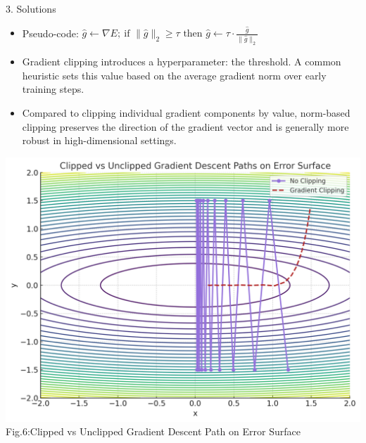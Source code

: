 \documentclass[final]{beamer}
\begin{document}
\begin{frame}[t]
\begin{columns}[t,totalwidth=\textwidth]
\begin{column}{0.3\textwidth}
\begin{block}{3. Solutions }
        \begin{minipage}{0.54\textwidth}
        \begin{itemize}
          \item \justifying Pseudo-code: $\hat{g} \leftarrow \nabla E;\ \text{if } \|\hat{g}\|_2 \geq \tau \text{ then } \hat{g} \leftarrow \tau \cdot \frac{\hat{g}}{\|\hat{g}\|_2}$
          \item \justifying Gradient clipping introduces a hyperparameter: the threshold. A common heuristic sets this value based on the average gradient norm over early training steps.
          \item \justifying Compared to clipping individual gradient components by value, norm-based clipping preserves the direction of the gradient vector and is generally more robust in high-dimensional settings.
        \end{itemize}
        \end{minipage}
        \hfill
        \begin{minipage}{0.45\textwidth}
        \centering
        \vspace{1em} %
        \includegraphics[width=\linewidth]{figures/gradient_clipping.png}
        \small Fig.6:Clipped vs Unclipped Gradient Descent Path on Error Surface
        \end{minipage}
        

\end{block}
\end{column}
\end{columns}
\end{frame}
\end{document}
